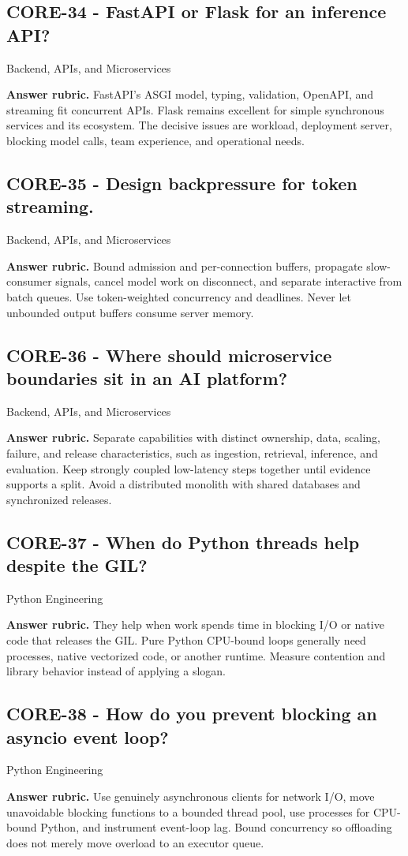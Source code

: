 \subsection*{CORE-34 - FastAPI or Flask for an inference API?}
 \quad Backend, APIs, and Microservices
\par\smallskip\textbf{Answer rubric.} FastAPI's ASGI model, typing, validation, OpenAPI, and streaming fit concurrent APIs. Flask remains excellent for simple synchronous services and its ecosystem. The decisive issues are workload, deployment server, blocking model calls, team experience, and operational needs.
\subsection*{CORE-35 - Design backpressure for token streaming.}
 \quad Backend, APIs, and Microservices
\par\smallskip\textbf{Answer rubric.} Bound admission and per-connection buffers, propagate slow-consumer signals, cancel model work on disconnect, and separate interactive from batch queues. Use token-weighted concurrency and deadlines. Never let unbounded output buffers consume server memory.
\subsection*{CORE-36 - Where should microservice boundaries sit in an AI platform?}
 \quad Backend, APIs, and Microservices
\par\smallskip\textbf{Answer rubric.} Separate capabilities with distinct ownership, data, scaling, failure, and release characteristics, such as ingestion, retrieval, inference, and evaluation. Keep strongly coupled low-latency steps together until evidence supports a split. Avoid a distributed monolith with shared databases and synchronized releases.
\subsection*{CORE-37 - When do Python threads help despite the GIL?}
 \quad Python Engineering
\par\smallskip\textbf{Answer rubric.} They help when work spends time in blocking I/O or native code that releases the GIL. Pure Python CPU-bound loops generally need processes, native vectorized code, or another runtime. Measure contention and library behavior instead of applying a slogan.
\subsection*{CORE-38 - How do you prevent blocking an asyncio event loop?}
 \quad Python Engineering
\par\smallskip\textbf{Answer rubric.} Use genuinely asynchronous clients for network I/O, move unavoidable blocking functions to a bounded thread pool, use processes for CPU-bound Python, and instrument event-loop lag. Bound concurrency so offloading does not merely move overload to an executor queue.
